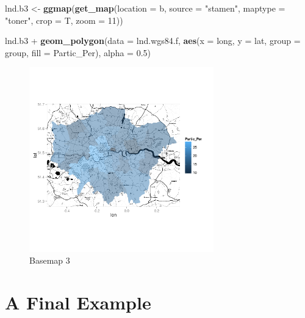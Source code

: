 \documentclass[]{article}
\newenvironment{Shaded}{}{}
\newcommand{\KeywordTok}[1]{\textcolor[rgb]{0.00,0.44,0.13}{\textbf{{#1}}}}
\newcommand{\DataTypeTok}[1]{\textcolor[rgb]{0.56,0.13,0.00}{{#1}}}
\newcommand{\DecValTok}[1]{\textcolor[rgb]{0.25,0.63,0.44}{{#1}}}
\newcommand{\FloatTok}[1]{\textcolor[rgb]{0.25,0.63,0.44}{{#1}}}
\newcommand{\StringTok}[1]{\textcolor[rgb]{0.25,0.44,0.63}{{#1}}}
\newcommand{\NormalTok}[1]{{#1}}
\let\Oldincludegraphics\includegraphics
\renewcommand{\includegraphics}[1]{\Oldincludegraphics[width=8cm]{#1}}
\begin{document}
\begin{Shaded}
\begin{Highlighting}[]
\NormalTok{lnd.b3 <- }\KeywordTok{ggmap}\NormalTok{(}\KeywordTok{get_map}\NormalTok{(}\DataTypeTok{location =} \NormalTok{b, }\DataTypeTok{source =} \StringTok{"stamen"}\NormalTok{, }\DataTypeTok{maptype =} \StringTok{"toner"}\NormalTok{, }
    \DataTypeTok{crop =} \NormalTok{T, }\DataTypeTok{zoom =} \DecValTok{11}\NormalTok{))}

\NormalTok{lnd.b3 + }\KeywordTok{geom_polygon}\NormalTok{(}\DataTypeTok{data =} \NormalTok{lnd.wgs84.f, }\KeywordTok{aes}\NormalTok{(}\DataTypeTok{x =} \NormalTok{long, }\DataTypeTok{y =} \NormalTok{lat, }\DataTypeTok{group =} \NormalTok{group, }
    \DataTypeTok{fill =} \NormalTok{Partic_Per), }\DataTypeTok{alpha =} \FloatTok{0.5}\NormalTok{)}
\end{Highlighting}
\end{Shaded}
\begin{figure}[htbp]
\centering
\includegraphics{figure/Basemap_3.png}
\caption{Basemap 3}
\end{figure}

\section{A Final Example}
\end{document}
